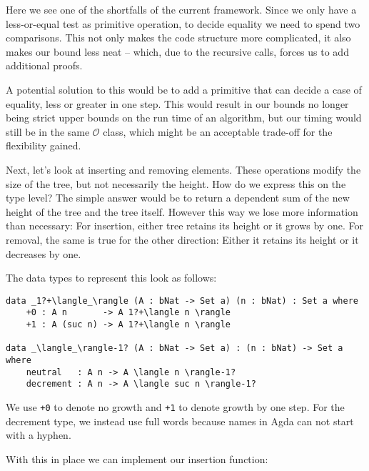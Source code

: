 Here we see one of the shortfalls of the current framework. Since we only have a less-or-equal test as primitive operation, to decide equality we need to spend two comparisons. This not only makes the code structure more complicated, it also makes our bound less neat -- which, due to the recursive calls, forces us to add additional proofs.

A potential solution to this would be to add a primitive that can decide a case of equality, less or greater in one step. This would result in our bounds no longer being strict upper bounds on the run time of an algorithm, but our timing would still be in the same $\mathcal O$ class, which might be an acceptable trade-off for the flexibility gained.

Next, let's look at inserting and removing elements. These operations modify the size of the tree, but not necessarily the height. How do we express this on the type level? The simple answer would be to return a dependent sum of the new height of the tree and the tree itself. However this way we lose more information than necessary: For insertion, either tree retains its height or it grows by one. For removal, the same is true for the other direction: Either it retains its height or it decreases by one.

The data types to represent this look as follows:

\begin{lstlisting}[caption={Maybe-Increment and Maybe-Decrement},label={lst:tree:inc-type},emph={neutral,decrement}]
data _1?+\langle_\rangle (A : bNat -> Set a) (n : bNat) : Set a where
    +0 : A n       -> A 1?+\langle n \rangle
    +1 : A (suc n) -> A 1?+\langle n \rangle

data _\langle_\rangle-1? (A : bNat -> Set a) : (n : bNat) -> Set a where
    neutral   : A n -> A \langle n \rangle-1?
    decrement : A n -> A \langle suc n \rangle-1?
\end{lstlisting}

We use \texttt{+0} to denote no growth and \texttt{+1} to denote growth by one step. For the decrement type, we instead use full words because names in Agda can not start with a hyphen.

With this in place we can implement our insertion function:

